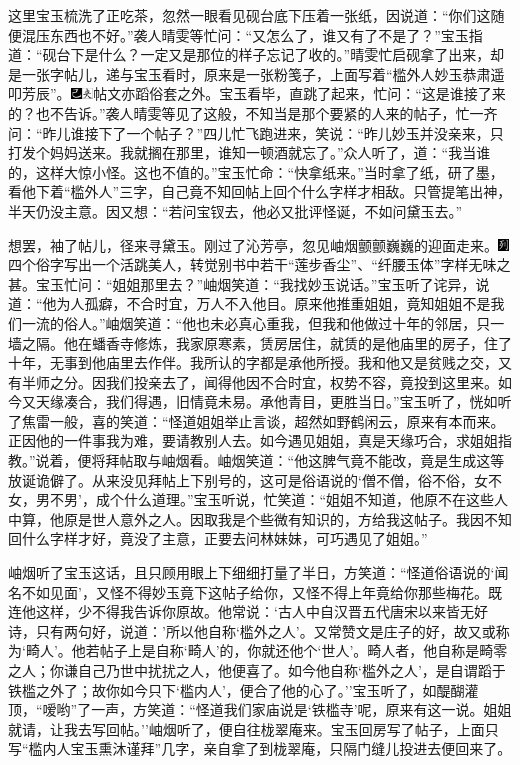 这里宝玉梳洗了正吃茶，忽然一眼看见砚台底下压着一张纸，因说道：``你们这随便混压东西也不好。''袭人晴雯等忙问：``又怎么了，谁又有了不是了？''宝玉指道：``砚台下是什么？一定又是那位的样子忘记了收的。''晴雯忙启砚拿了出来，却是一张字帖儿，递与宝玉看时，原来是一张粉笺子，上面写着``槛外人妙玉恭肃遥叩芳辰''。{\includegraphics[width=3mm]{../Images/00003}\includegraphics[width=3mm]{../Images/00012}\footnotesize \kaishu 帖文亦蹈俗套之外。}宝玉看毕，直跳了起来，忙问：``这是谁接了来的？也不告诉。''袭人晴雯等见了这般，不知当是那个要紧的人来的帖子，忙一齐问：``昨儿谁接下了一个帖子？''四儿忙飞跑进来，笑说：``昨儿妙玉并没亲来，只打发个妈妈送来。我就搁在那里，谁知一顿酒就忘了。''众人听了，道：``我当谁的，这样大惊小怪。这也不值的。''宝玉忙命：``快拿纸来。''当时拿了纸，研了墨，看他下着``槛外人''三字，自己竟不知回帖上回个什么字样才相敌。只管提笔出神，半天仍没主意。因又想：``若问宝钗去，他必又批评怪诞，不如问黛玉去。''

想罢，袖了帖儿，径来寻黛玉。刚过了沁芳亭，忽见岫烟颤颤巍巍的迎面走来。{\includegraphics[width=3mm]{../Images/00007}四个俗字写出一个活跳美人，转觉别书中若干``莲步香尘''、``纤腰玉体''字样无味之甚。}宝玉忙问：``姐姐那里去？''岫烟笑道：``我找妙玉说话。''宝玉听了诧异，说道：``他为人孤癖，不合时宜，万人不入他目。原来他推重姐姐，竟知姐姐不是我们一流的俗人。''岫烟笑道：``他也未必真心重我，但我和他做过十年的邻居，只一墙之隔。他在蟠香寺修炼，我家原寒素，赁房居住，就赁的是他庙里的房子，住了十年，无事到他庙里去作伴。我所认的字都是承他所授。我和他又是贫贱之交，又有半师之分。因我们投亲去了，闻得他因不合时宜，权势不容，竟投到这里来。如今又天缘凑合，我们得遇，旧情竟未易。承他青目，更胜当日。''宝玉听了，恍如听了焦雷一般，喜的笑道：``怪道姐姐举止言谈，超然如野鹤闲云，原来有本而来。正因他的一件事我为难，要请教别人去。如今遇见姐姐，真是天缘巧合，求姐姐指教。''说着，便将拜帖取与岫烟看。岫烟笑道：``他这脾气竟不能改，竟是生成这等放诞诡僻了。从来没见拜帖上下别号的，这可是俗语说的`僧不僧，俗不俗，女不女，男不男'，成个什么道理。''宝玉听说，忙笑道：``姐姐不知道，他原不在这些人中算，他原是世人意外之人。因取我是个些微有知识的，方给我这帖子。我因不知回什么字样才好，竟没了主意，正要去问林妹妹，可巧遇见了姐姐。''

岫烟听了宝玉这话，且只顾用眼上下细细打量了半日，方笑道：``怪道俗语说的`闻名不如见面'，又怪不得妙玉竟下这帖子给你，又怪不得上年竟给你那些梅花。既连他这样，少不得我告诉你原故。他常说：`古人中自汉晋五代唐宋以来皆无好诗，只有两句好，说道：'所以他自称`槛外之人'。又常赞文是庄子的好，故又或称为`畸人'。他若帖子上是自称`畸人'的，你就还他个`世人'。畸人者，他自称是畸零之人；你谦自己乃世中扰扰之人，他便喜了。如今他自称`槛外之人'，是自谓蹈于铁槛之外了；故你如今只下`槛内人'，便合了他的心了。''宝玉听了，如醍醐灌顶，``嗳哟''了一声，方笑道：``怪道我们家庙说是`铁槛寺'呢，原来有这一说。姐姐就请，让我去写回帖。''岫烟听了，便自往栊翠庵来。宝玉回房写了帖子，上面只写``槛内人宝玉熏沐谨拜''几字，亲自拿了到栊翠庵，只隔门缝儿投进去便回来了。

